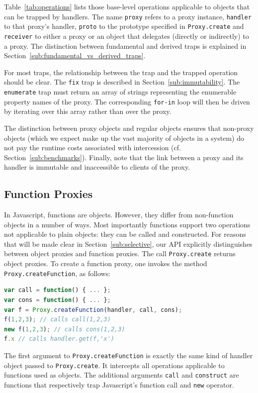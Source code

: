 \documentclass{sig-alternate}
\begin{document}
Table~\ref{tab:operations} lists those base-level operations applicable to objects that can be trapped by handlers. The name \texttt{proxy} refers to a proxy instance, \texttt{handler} to that proxy's handler, \texttt{proto} to the prototype specified in \texttt{Proxy.create} and \texttt{receiver} to either a proxy or an object that delegates (directly or indirectly) to a proxy. The distinction between fundamental and derived traps is explained in Section~\ref{sub:fundamental_vs_derived_traps}.

For most traps, the relationship between the trap and the trapped operation should be clear. The \texttt{fix} trap is described in Section~\ref{sub:immutability}. The \texttt{enumerate} trap must return an array of strings representing the enumerable property names of the proxy. The corresponding \texttt{for-in} loop will then be driven by iterating over this array rather than over the proxy.

The distinction between proxy objects and regular objects ensures that non-proxy objects (which we expect make up the vast majority of objects in a system) do not pay the runtime costs associated with intercession (cf. Section~\ref{sub:benchmarks}). Finally, note that the link between a proxy and its handler is immutable and inaccessible to clients of the proxy.

\subsection{Function Proxies}
\label{sub:funproxies}

In Javascript, functions are objects. However, they differ from non-function objects in a number of ways. Most importantly functions support two operations not applicable to plain objects: they can be called and constructed. For reasons that will be made clear in Section~\ref{sub:selective}, our API explicitly distinguishes between object proxies and function proxies. The call \texttt{Proxy.create} returns object proxies. To create a function proxy, one invokes the method \texttt{Proxy.createFunction}, as follows:

\begin{lstlisting}[language=javascript]
var call = function() { ... };
var cons = function() { ... };
var f = Proxy.createFunction(handler, call, cons);
f(1,2,3); // calls call(1,2,3)
new f(1,2,3); // calls cons(1,2,3)
f.x // calls handler.get(f,'x')
\end{lstlisting}

The first argument to \texttt{Proxy.createFunction} is exactly the same kind of handler object passed to \texttt{Proxy.create}. It intercepts all operations applicable to functions used as objects. The additional arguments \texttt{call} and \texttt{construct} are functions that respectively trap Javascript's function call and \texttt{new} operator.
\end{document}
